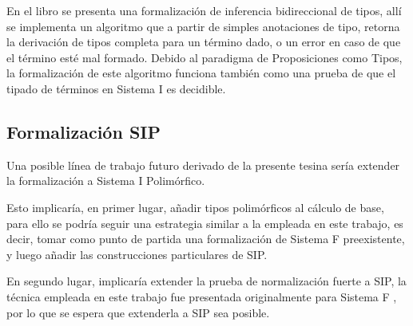 En el libro  \cite{plfa} se presenta una formalización de inferencia bidireccional de tipos, allí se implementa un algoritmo que a partir de simples anotaciones de tipo, retorna la derivación de tipos completa para un término dado, o un error en caso de que el término esté mal formado.
Debido al paradigma de Proposiciones como Tipos, la formalización de este algoritmo funciona también como una prueba de que el tipado de términos en Sistema I es decidible.

\subsection{Formalización SIP}

Una posible línea de trabajo futuro derivado de la presente tesina sería extender la formalización a Sistema I Polimórfico.

Esto implicaría, en primer lugar, añadir tipos polimórficos al cálculo de base, para ello se podría seguir una estrategia similar a la empleada en este trabajo, es decir, tomar como punto de partida una formalización de Sistema F preexistente, y luego añadir las construcciones particulares de SIP.

En segundo lugar, implicaría extender la prueba de normalización fuerte a SIP, la técnica empleada en este trabajo fue presentada originalmente para Sistema F \cite{Schafer}, por lo que se espera que extenderla a SIP sea posible.